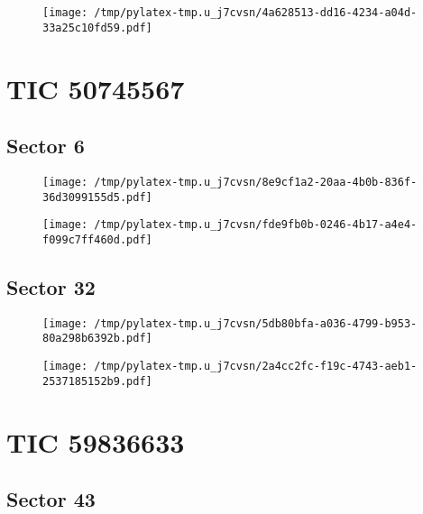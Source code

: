 \documentclass{report}%
\begin{document}
%


\begin{figure}[H]%
\centering%
\texttt{[image: /tmp/pylatex-tmp.u\_j7cvsn/4a628513-dd16-4234-a04d-33a25c10fd59.pdf]}%
\end{figure}

%
\section{TIC 50745567}%
\label{sec:TIC50745567}%
\subsection{Sector 6}%
\label{subsec:507455676}%


\begin{figure}[H]%
\centering%
\centering%
\texttt{[image: /tmp/pylatex-tmp.u\_j7cvsn/8e9cf1a2-20aa-4b0b-836f-36d3099155d5.pdf]}%
\end{figure}

%


\begin{figure}[H]%
\centering%
\texttt{[image: /tmp/pylatex-tmp.u\_j7cvsn/fde9fb0b-0246-4b17-a4e4-f099c7ff460d.pdf]}%
\end{figure}

%
\subsection{Sector 32}%
\label{subsec:5074556732}%


\begin{figure}[H]%
\centering%
\centering%
\texttt{[image: /tmp/pylatex-tmp.u\_j7cvsn/5db80bfa-a036-4799-b953-80a298b6392b.pdf]}%
\end{figure}

%


\begin{figure}[H]%
\centering%
\texttt{[image: /tmp/pylatex-tmp.u\_j7cvsn/2a4cc2fc-f19c-4743-aeb1-2537185152b9.pdf]}%
\end{figure}

%
\section{TIC 59836633}%
\label{sec:TIC59836633}%
\subsection{Sector 43}%
\label{subsec:5983663343}%
\end{document}
